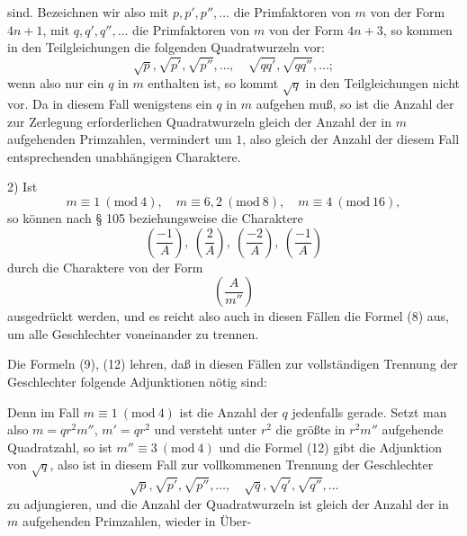 sind. Bezeichnen wir also mit $p, p', p'', \ldots$ die Primfaktoren von $m$ von der Form $4n+1$, mit $q, q', q'', \ldots$ die Primfaktoren von $m$ von der Form $4n+3$, so kommen in den Teilgleichungen die folgenden Quadratwurzeln vor:
\[
\sqrt{p}, \sqrt{p'}, \sqrt{p''}, \ldots, \quad \sqrt{qq'}, \sqrt{qq''}, \ldots;
\]
wenn also nur ein $q$ in $m$ enthalten ist, so kommt $\sqrt{q}$ in den Teilgleichungen nicht vor. Da in diesem Fall wenigstens ein $q$ in $m$ aufgehen muß, so ist die Anzahl der zur Zerlegung erforderlichen Quadratwurzeln gleich der Anzahl der in $m$ aufgehenden Primzahlen, vermindert um $1$, also gleich der Anzahl der diesem Fall entsprechenden unabhängigen Charaktere.

2) Ist
\[
m\equiv 1\ (\mathrm{mod}\ 4), \quad m\equiv 6, 2\ (\mathrm{mod}\ 8), \quad m\equiv 4\ (\mathrm{mod}\ 16),
\]
so können nach § 105 beziehungsweise die Charaktere
\[
\left(\frac{-1}{A}\right), \ \left(\frac{2}{A}\right), \ \left(\frac{-2}{A}\right), \ \left(\frac{-1}{A}\right)
\]
durch die Charaktere von der Form
\[
\left(\frac{A}{m''}\right)
\]
ausgedrückt werden, und es reicht also auch in diesen Fällen die Formel (8) aus, um alle Geschlechter voneinander zu trennen.

Die Formeln (9), (12) lehren, daß in diesen Fällen zur vollständigen Trennung der Geschlechter folgende Adjunktionen nötig sind:

Denn im Fall $m\equiv 1 \ (\mathrm{mod}\ 4)$ ist die Anzahl der $q$ jedenfalls gerade. Setzt man also $m = q r^2 m''$, $m' = q r^2$ und versteht unter $r^2$ die größte in $r^2 m''$ aufgehende Quadratzahl, so ist $m''\equiv 3 \ (\mathrm{mod}\ 4)$ und die Formel (12) gibt die Adjunktion von $\sqrt{q}$, also ist in diesem Fall zur vollkommenen Trennung der Geschlechter
\[
\sqrt{p}, \sqrt{p'}, \sqrt{p''}, \ldots, \quad \sqrt{q}, \sqrt{q'}, \sqrt{q''}, \ldots
\]
zu adjungieren, und die Anzahl der Quadratwurzeln ist gleich der Anzahl der in $m$ aufgehenden Primzahlen, wieder in Über-
